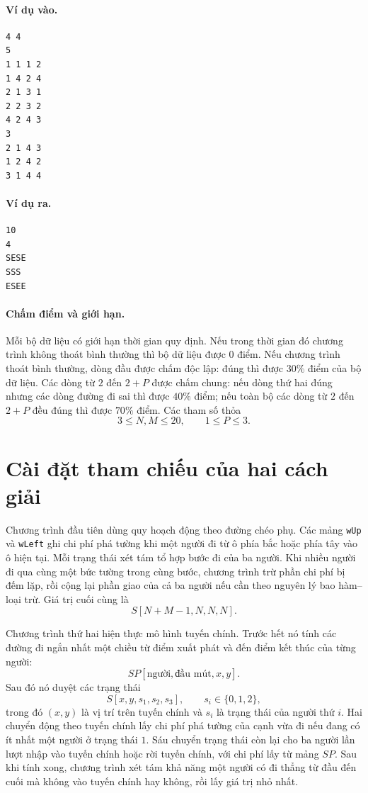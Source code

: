 \documentclass[11pt]{article}
\begin{document}
\paragraph{Ví dụ vào.}
\begin{verbatim}
4 4
5
1 1 1 2
1 4 2 4
2 1 3 1
2 2 3 2
4 2 4 3
3
2 1 4 3
1 2 4 2
3 1 4 4
\end{verbatim}

\paragraph{Ví dụ ra.}
\begin{verbatim}
10
4
SESE
SSS
ESEE
\end{verbatim}

\paragraph{Chấm điểm và giới hạn.}
Mỗi bộ dữ liệu có giới hạn thời gian quy định. Nếu trong thời gian đó chương
trình không thoát bình thường thì bộ dữ liệu được $0$ điểm. Nếu chương trình
thoát bình thường, dòng đầu được chấm độc lập: đúng thì được $30\%$ điểm của
bộ dữ liệu. Các dòng từ $2$ đến $2+P$ được chấm chung: nếu dòng thứ hai đúng
nhưng các dòng đường đi sai thì được $40\%$ điểm; nếu toàn bộ các dòng từ $2$
đến $2+P$ đều đúng thì được $70\%$ điểm. Các tham số thỏa
\[
  3\le N,M\le 20,\qquad 1\le P\le 3.
\]

\section{Cài đặt tham chiếu của hai cách giải}

Chương trình đầu tiên dùng quy hoạch động theo đường chéo phụ. Các mảng
\texttt{wUp} và \texttt{wLeft} ghi chi phí phá tường khi một người đi từ ô
phía bắc hoặc phía tây vào ô hiện tại. Mỗi trạng thái xét tám tổ hợp bước đi
của ba người. Khi nhiều người đi qua cùng một bức tường trong cùng bước,
chương trình trừ phần chi phí bị đếm lặp, rồi cộng lại phần giao của cả ba
người nếu cần theo nguyên lý bao hàm--loại trừ. Giá trị cuối cùng là
\[
  S[N+M-1,N,N,N].
\]

Chương trình thứ hai hiện thực mô hình tuyến chính. Trước hết nó tính các
đường đi ngắn nhất một chiều từ điểm xuất phát và đến điểm kết thúc của từng
người:
\[
  SP[\text{người},\text{đầu mút},x,y].
\]
Sau đó nó duyệt các trạng thái
\[
  S[x,y,s_1,s_2,s_3],\qquad s_i\in\{0,1,2\},
\]
trong đó $(x,y)$ là vị trí trên tuyến chính và $s_i$ là trạng thái của người
thứ $i$. Hai chuyển động theo tuyến chính lấy chi phí phá tường của cạnh vừa
đi nếu đang có ít nhất một người ở trạng thái $1$. Sáu chuyển trạng thái còn
lại cho ba người lần lượt nhập vào tuyến chính hoặc rời tuyến chính, với chi
phí lấy từ mảng $SP$. Sau khi tính xong, chương trình xét tám khả năng một
người có đi thẳng từ đầu đến cuối mà không vào tuyến chính hay không, rồi lấy
giá trị nhỏ nhất.
\end{document}
